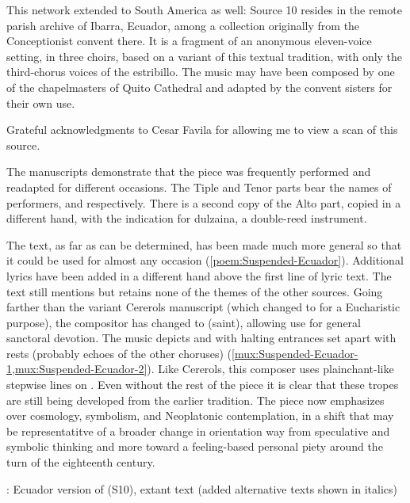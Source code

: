 This network extended to South America as well: Source 10 resides in the remote
parish archive of Ibarra, Ecuador, among a collection originally from the
Conceptionist convent there.
It is a fragment of an anonymous eleven-voice setting, in three choirs, based on
a variant of this textual tradition, with only the third-chorus voices of the
estribillo.
The music may have been composed by one of the chapelmasters of Quito Cathedral
and adapted by the convent sisters for their own use.%
\begin{Footnote}
    Grateful acknowledgments to Cesar Favila for allowing me to view a scan of
    this source.
\end{Footnote}
The manuscripts demonstrate that the piece was frequently performed and
readapted for different occasions.
The Tiple and Tenor parts bear the names of performers, 
and  respectively.
There is a second copy of the Alto part, copied in a different hand, with the
indication for dulzaina, a double-reed instrument.

The text, as far as can be determined, has been made much more general so that
it could be used for almost any occasion (\cref{poem:Suspended-Ecuador}).
Additional lyrics have been added in a different hand above the first line of
lyric text.
The text still mentions  but retains none of the themes of the
other sources.
Going farther than the variant Cererols manuscript (which changed 
to  for a Eucharistic purpose), the compositor has changed
 to  (saint), allowing use for general sanctoral
devotion.
The music depicts  and  with halting
entrances set apart with rests (probably echoes of the other choruses)
(\cref{mux:Suspended-Ecuador-1,mux:Suspended-Ecuador-2}).
Like Cererols, this composer uses plainchant-like stepwise lines on .
Even without the rest of the piece it is clear that these tropes are still being
developed from the earlier tradition.
The piece now emphasizes  over cosmology, symbolism,
and Neoplatonic contemplation, in a shift that may be representatitve of a
broader change in orientation way from speculative and symbolic thinking and
more toward a feeling-based personal piety around the turn of the eighteenth
century.

{: Ecuador version of 
(S10), extant text (added alternative texts shown in italics)}

